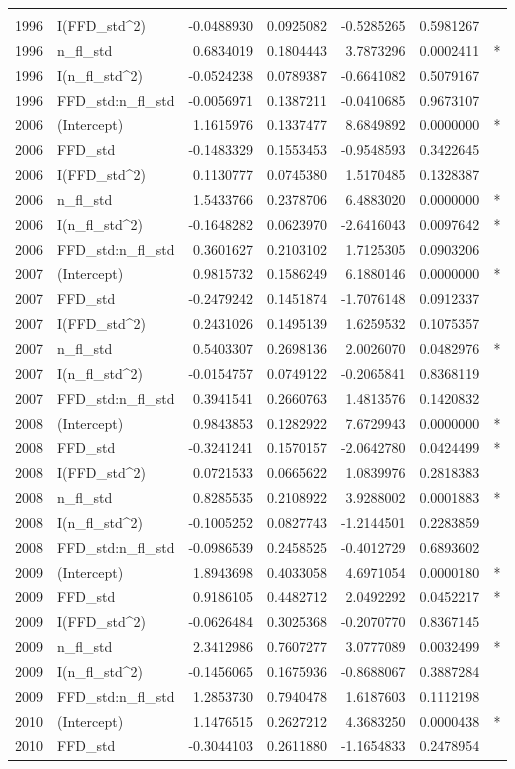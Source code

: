 \documentclass[]{article}
\begin{document}
\begin{longtable}[]{@{}llrrrrl@{}}
&\tabularnewline
1996 & I(FFD\_std\^{}2) & -0.0488930 & 0.0925082 & -0.5285265 &
0.5981267 &\tabularnewline
1996 & n\_fl\_std & 0.6834019 & 0.1804443 & 3.7873296 & 0.0002411 &
*\tabularnewline
1996 & I(n\_fl\_std\^{}2) & -0.0524238 & 0.0789387 & -0.6641082 &
0.5079167 &\tabularnewline
1996 & FFD\_std:n\_fl\_std & -0.0056971 & 0.1387211 & -0.0410685 &
0.9673107 &\tabularnewline
2006 & (Intercept) & 1.1615976 & 0.1337477 & 8.6849892 & 0.0000000 &
*\tabularnewline
2006 & FFD\_std & -0.1483329 & 0.1553453 & -0.9548593 & 0.3422645
&\tabularnewline
2006 & I(FFD\_std\^{}2) & 0.1130777 & 0.0745380 & 1.5170485 & 0.1328387
&\tabularnewline
2006 & n\_fl\_std & 1.5433766 & 0.2378706 & 6.4883020 & 0.0000000 &
*\tabularnewline
2006 & I(n\_fl\_std\^{}2) & -0.1648282 & 0.0623970 & -2.6416043 &
0.0097642 & *\tabularnewline
2006 & FFD\_std:n\_fl\_std & 0.3601627 & 0.2103102 & 1.7125305 &
0.0903206 &\tabularnewline
2007 & (Intercept) & 0.9815732 & 0.1586249 & 6.1880146 & 0.0000000 &
*\tabularnewline
2007 & FFD\_std & -0.2479242 & 0.1451874 & -1.7076148 & 0.0912337
&\tabularnewline
2007 & I(FFD\_std\^{}2) & 0.2431026 & 0.1495139 & 1.6259532 & 0.1075357
&\tabularnewline
2007 & n\_fl\_std & 0.5403307 & 0.2698136 & 2.0026070 & 0.0482976 &
*\tabularnewline
2007 & I(n\_fl\_std\^{}2) & -0.0154757 & 0.0749122 & -0.2065841 &
0.8368119 &\tabularnewline
2007 & FFD\_std:n\_fl\_std & 0.3941541 & 0.2660763 & 1.4813576 &
0.1420832 &\tabularnewline
2008 & (Intercept) & 0.9843853 & 0.1282922 & 7.6729943 & 0.0000000 &
*\tabularnewline
2008 & FFD\_std & -0.3241241 & 0.1570157 & -2.0642780 & 0.0424499 &
*\tabularnewline
2008 & I(FFD\_std\^{}2) & 0.0721533 & 0.0665622 & 1.0839976 & 0.2818383
&\tabularnewline
2008 & n\_fl\_std & 0.8285535 & 0.2108922 & 3.9288002 & 0.0001883 &
*\tabularnewline
2008 & I(n\_fl\_std\^{}2) & -0.1005252 & 0.0827743 & -1.2144501 &
0.2283859 &\tabularnewline
2008 & FFD\_std:n\_fl\_std & -0.0986539 & 0.2458525 & -0.4012729 &
0.6893602 &\tabularnewline
2009 & (Intercept) & 1.8943698 & 0.4033058 & 4.6971054 & 0.0000180 &
*\tabularnewline
2009 & FFD\_std & 0.9186105 & 0.4482712 & 2.0492292 & 0.0452217 &
*\tabularnewline
2009 & I(FFD\_std\^{}2) & -0.0626484 & 0.3025368 & -0.2070770 &
0.8367145 &\tabularnewline
2009 & n\_fl\_std & 2.3412986 & 0.7607277 & 3.0777089 & 0.0032499 &
*\tabularnewline
2009 & I(n\_fl\_std\^{}2) & -0.1456065 & 0.1675936 & -0.8688067 &
0.3887284 &\tabularnewline
2009 & FFD\_std:n\_fl\_std & 1.2853730 & 0.7940478 & 1.6187603 &
0.1112198 &\tabularnewline
2010 & (Intercept) & 1.1476515 & 0.2627212 & 4.3683250 & 0.0000438 &
*\tabularnewline
2010 & FFD\_std & -0.3044103 & 0.2611880 & -1.1654833 & 0.2478954

\end{longtable}
\end{document}
